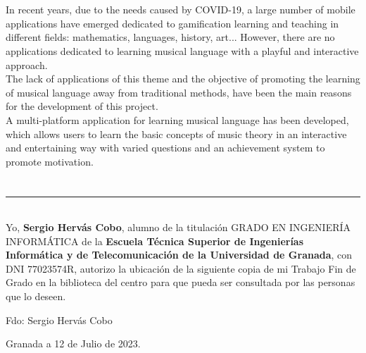 \\

\vspace{0.7cm}
\\

In recent years, due to the needs caused by COVID-19, a large number of mobile applications have emerged dedicated to gamification learning and teaching in different fields: mathematics, languages, history, art... 
However, there are no applications dedicated to learning musical language with a playful and interactive approach.\\

The lack of applications of this theme and the objective of promoting the learning of musical language away from traditional methods, have been the main reasons for the development of this project.\\

A multi-platform application for learning musical language has been developed, which allows users to learn the basic concepts of music theory in an interactive and entertaining way with varied questions and an achievement system to promote motivation.



\chapter*{}
\thispagestyle{empty}

\noindent\rule[-1ex]{\textwidth}{2pt}\\[4.5ex]

Yo, \textbf{Sergio Hervás Cobo}, alumno de la titulación GRADO EN INGENIERÍA INFORMÁTICA de la \textbf{Escuela Técnica Superior
de Ingenierías Informática y de Telecomunicación de la Universidad de Granada}, con DNI 77023574R, autorizo la
ubicación de la siguiente copia de mi Trabajo Fin de Grado en la biblioteca del centro para que pueda ser
consultada por las personas que lo deseen.

\vspace{6cm}

\noindent Fdo: Sergio Hervás Cobo

\vspace{2cm}

\begin{flushright}
Granada a 12 de Julio de 2023.
\end{flushright}


